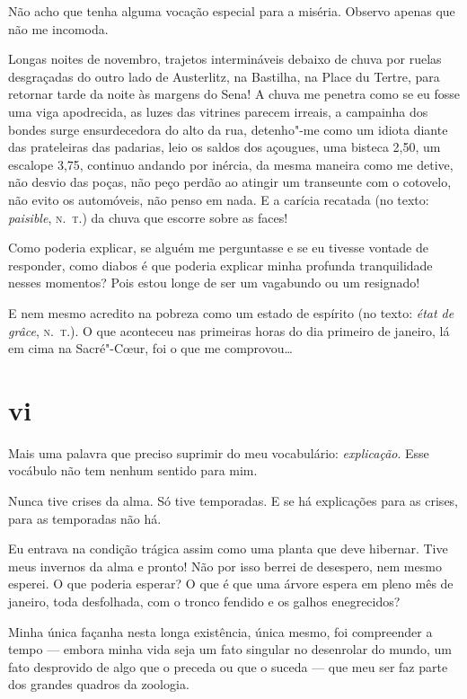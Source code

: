 Não acho que tenha alguma vocação especial para a miséria. Observo
apenas que não me incomoda.

Longas noites de novembro, trajetos intermináveis debaixo de
chuva por ruelas desgraçadas do outro lado de Austerlitz, na Bastilha,
na Place du Tertre, para retornar tarde da noite às margens do Sena! A
chuva me penetra como se eu fosse uma viga apodrecida, as luzes das
vitrines parecem irreais, a campainha dos bondes surge ensurdecedora
do alto da rua, detenho"-me como um idiota diante das prateleiras das
padarias, leio os saldos dos açougues, uma bisteca 2,50, um escalope
3,75, continuo andando por inércia, da mesma maneira como me detive, não
desvio das poças, não peço perdão ao atingir um transeunte com o
cotovelo, não evito os automóveis, não penso em nada. E a carícia
recatada (no texto: \emph{paisible}, \textsc{n.~t.}) da chuva que escorre sobre as
faces!

Como poderia explicar, se alguém me perguntasse e se eu tivesse
vontade de responder, como diabos é que poderia explicar minha
profunda tranquilidade nesses momentos? Pois estou longe de ser um
vagabundo ou um resignado!

E nem mesmo acredito na pobreza como um estado de espírito (no texto:
\emph{état de grâce}, \textsc{n.~t.}). O que aconteceu nas primeiras horas do dia
primeiro de janeiro, lá em cima na Sacré"-C\oe ur, foi o que me
comprovou\ldots{}

\section{vi}

Mais uma palavra que preciso suprimir do meu vocabulário:
\emph{explicação}. Esse vocábulo não tem nenhum sentido para mim.

Nunca tive crises da alma. Só tive temporadas. E se há explicações para
as crises, para as temporadas não há.

Eu entrava na condição trágica assim como uma planta que deve hibernar.
Tive meus invernos da alma e pronto! Não por isso berrei de
desespero, nem mesmo esperei. O que poderia esperar? O que é que uma
árvore espera em pleno mês de janeiro, toda desfolhada, com o tronco
fendido e os galhos enegrecidos?

Minha única façanha nesta longa existência, única mesmo, foi
compreender a tempo --- embora minha vida seja um fato singular no
desenrolar do mundo, um fato desprovido de algo que o preceda ou que o
suceda --- que meu ser faz parte dos grandes quadros da zoologia.

